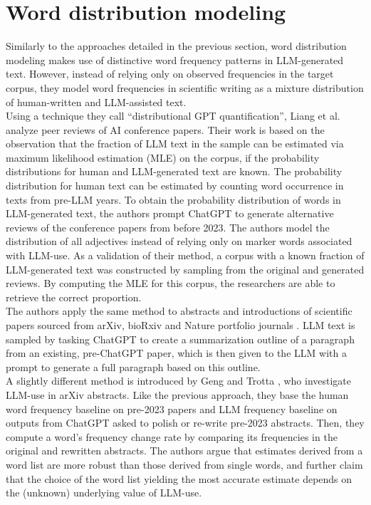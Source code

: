 \section{Word distribution modeling}\label{subsec:freq_model}
Similarly to the approaches detailed in the previous section, word distribution modeling makes use of distinctive word frequency patterns in LLM-generated text.
However, instead of relying only on observed frequencies in the target corpus, they model word frequencies in scientific writing as a mixture distribution of human-written and LLM-assisted text.
\\
Using a technique they call ``distributional GPT quantification'', Liang et al. \cite{Liang2024_review} analyze peer reviews of AI conference papers.
Their work is based on the observation that the fraction of LLM text in the sample can be estimated via maximum likelihood estimation (MLE) on the corpus, if the probability distributions for human and LLM-generated text are known. 
The probability distribution for human text can be estimated by counting word occurrence in texts from pre-LLM years.
To obtain the probability distribution of words in LLM-generated text, the authors prompt ChatGPT to generate alternative reviews of the conference papers from before 2023.
The authors model the distribution of all adjectives instead of relying only on marker words associated with LLM-use.
As a validation of their method, a corpus with a known fraction of LLM-generated text was constructed by sampling from the original and generated reviews. 
By computing the MLE for this corpus, the researchers are able to retrieve the correct proportion.
\\
The authors apply the same method to abstracts and introductions of scientific papers sourced from arXiv, bioRxiv and Nature portfolio journals \cite{Liang2024_paper, Liang2025}. 
LLM text is sampled by tasking ChatGPT to create a summarization outline of a paragraph from an existing, pre-ChatGPT paper, which is then given to the LLM with a prompt to generate a full paragraph based on this outline.
\\
A slightly different method is introduced by Geng and Trotta \cite{Geng2024}, who investigate LLM-use in arXiv abstracts.
Like the previous approach, they base the human word frequency baseline on pre-2023 papers and LLM frequency baseline on outputs from ChatGPT asked to polish or re-write pre-2023 abstracts.
Then, they compute a word's frequency change rate by comparing its frequencies in the original and rewritten abstracts.
The authors argue that estimates derived from a word list are more robust than those derived from single words, and further claim that the choice of the word list yielding the most accurate estimate depends on the (unknown) underlying value of LLM-use.
